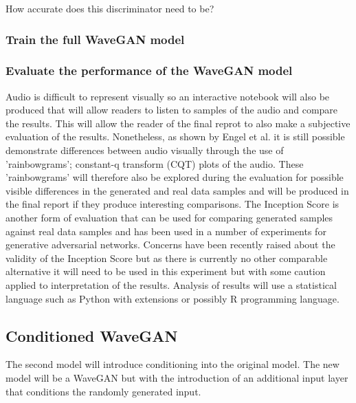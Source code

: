 \documentclass[a4paper, titlepage]{article}
\begin{document}
How accurate does this discriminator need to be?

\subsubsection{Train the full WaveGAN model}

\subsubsection{Evaluate the performance of the WaveGAN model}

Audio is difficult to represent visually so an interactive notebook will also be produced that will allow readers to listen to samples of the audio and compare the results.
This will allow the reader of the final reprot to also make a subjective evaluation of the results.
\newline
\newline
Nonetheless, as shown by Engel et al. it is still possible demonstrate differences between audio visually through the use of 'rainbowgrams'; constant-q transform (CQT) plots of the audio.
These 'rainbowgrams' will therefore also be explored during the evaluation for possible visible differences in the generated and real data samples and will be produced in the final report if they produce interesting comparisons.
\newline
\newline
The Inception Score is another form of evaluation that can be used for comparing generated samples against real data samples and has been used in a number of experiments for generative adversarial networks.
Concerns have been recently raised about the validity of the Inception Score but as there is currently no other comparable alternative it will need to be used in this experiment but with some caution applied to interpretation of the results.
\newline
\newline
Analysis of results will use a statistical language such as Python with extensions or possibly R programming language.

\subsection{Conditioned WaveGAN}

The second model will introduce conditioning into the original model.
The new model will be a WaveGAN but with the introduction of an additional input layer that conditions the randomly generated input.
\end{document}

